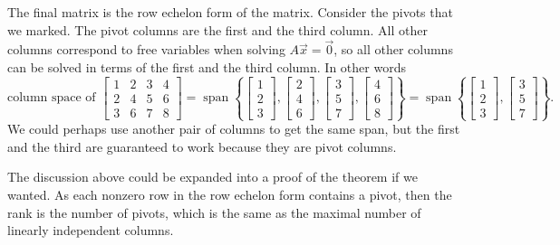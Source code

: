 The final matrix is the row echelon form of the matrix.
Consider the pivots that we marked.
The pivot columns are the first and the third
column.  All other columns correspond to free variables when solving
$A \vec{x} = \vec{0}$, so all other columns can be solved in terms of the first and
the third column.  In other words
\begin{equation*}
\text{column space of }
\begin{bmatrix}
1 & 2 & 3 & 4 \\
2 & 4 & 5 & 6 \\
3 & 6 & 7 & 8
\end{bmatrix}
=
\operatorname{span}
\left\{
\begin{bmatrix}
1 \\
2 \\
3 
\end{bmatrix}
,
\begin{bmatrix}
2 \\
4 \\
6
\end{bmatrix}
,
\begin{bmatrix}
3 \\
5 \\
7
\end{bmatrix}
,
\begin{bmatrix}
4 \\
6 \\
8
\end{bmatrix}
\right\}
=
\operatorname{span}
\left\{
\begin{bmatrix}
1 \\
2 \\
3
\end{bmatrix}
,
\begin{bmatrix}
3 \\
5 \\
7
\end{bmatrix}
\right\} .
\end{equation*}
We could perhaps use another pair of columns to get the same span, but the
first and the third are guaranteed to work because they are pivot columns.

The discussion above could be expanded into a proof of the theorem if
we wanted.
As each nonzero row
in the row echelon form contains a pivot, then the rank is the number of
pivots, which is the same as the maximal number of linearly independent
columns.

\medskip

